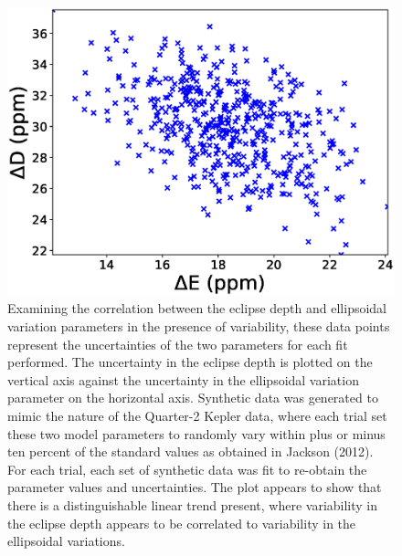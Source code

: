 \documentclass[manuscript]{aastex}
\begin{document}
\begin{figure}

\includegraphics[width=1.0\textwidth]{synthetic_correlation_ellipsoidal_vary.eps}
\caption{Examining the correlation between the eclipse depth and ellipsoidal variation parameters in the presence of variability, these data points represent the uncertainties of the two parameters for each fit performed. The uncertainty in the eclipse depth is plotted on the vertical axis against the uncertainty in the ellipsoidal variation parameter on the horizontal axis. Synthetic data was generated to mimic the nature of the Quarter-2 Kepler data, where each trial set these two model parameters to randomly vary within plus or minus ten percent of the standard values as obtained in Jackson (2012). For each trial, each set of synthetic data was fit to re-obtain the parameter values and uncertainties. The plot appears to show that there is a distinguishable linear trend present, where variability in the eclipse depth appears to be correlated to variability in the ellipsoidal variations.}

\end{figure}
\end{document}
